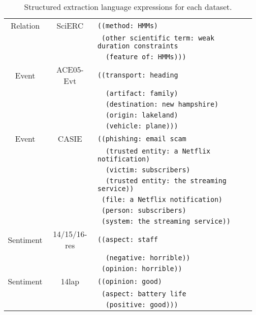 \documentclass[11pt]{article}
\begin{document}
\begin{table*}[htbp]
{\begin{tabular}{ccl}
  \midrule
  Relation & SciERC & \texttt{((method:~HMMs)} \\
        &       & \texttt{~(other scientific term:~weak duration constraints} \\
        &       & \texttt{~~(feature of:~HMMs)))} \\
  \midrule
  Event & ACE05-Evt & \texttt{((transport:~heading} \\
        &       & \texttt{~~(artifact:~family)} \\
        &       & \texttt{~~(destination:~new hampshire)} \\
        &       & \texttt{~~(origin:~lakeland)} \\
        &       & \texttt{~~(vehicle:~plane)))} \\
  \midrule
  Event & CASIE & \texttt{((phishing:~email scam} \\
        &       & \texttt{~~(trusted entity:~a Netflix notification)} \\
        &       & \texttt{~~(victim:~subscribers)} \\
        &       & \texttt{~~(trusted entity:~the streaming service))} \\
        &       & \texttt{~(file:~a Netflix notification)} \\
        &       & \texttt{~(person:~subscribers)} \\
        &       & \texttt{~(system:~the streaming service))} \\
  \midrule
  Sentiment & 14/15/16-res & \texttt{((aspect:~staff} \\
        &       & \texttt{~~(negative:~horrible))} \\
        &       & \texttt{~(opinion:~horrible))} \\
  \midrule
  Sentiment & 14lap & \texttt{((opinion:~good)} \\
        &       & \texttt{~(aspect:~battery life} \\
        &       & \texttt{~~(positive:~good)))} \\
  \bottomrule
  \end{tabular}}
  \caption{Structured extraction language expressions for each dataset.}
  \label{tab:sel-example}\end{table*}  
\end{document}
